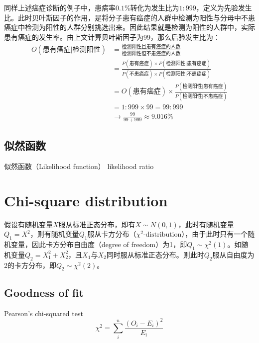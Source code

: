 \documentclass[11pt]{article}
\begin{document}
\begin{example}
    同样上述癌症诊断的例子中，患病率$0.1\%$转化为发生比为$1:999$，定义为先验发生比。此时贝叶斯因子的作用，是将分子患有癌症的人群中检测为阳性与分母中不患癌症中检测为阳性的人群分别挑选出来。因此结果就是检测为阳性的人群中，实际患有癌症的发生率。由上文计算贝叶斯因子为99，那么后验发生比为：
    \begin{align*}
        O(\text{患有癌症}|\text{检测阳性}) &= \frac{\text{检测阳性且患有癌症的人数}}{\text{检测阳性但不患癌症的人数}} \\
        &= \frac{P(\text{患有癌症}) \times P(\text{检测阳性}|\text{患有癌症})}{P(\text{不患癌症}) \times P(\text{检测阳性}|\text{不患癌症})} \\
        &= O(\text{患有癌症}) \times \frac{P(\text{检测阳性}|\text{患有癌症})}{P(\text{检测阳性}|\text{不患癌症})} \\
        &= 1:999 \times 99 = 99:999 \\
        &\rightarrow \frac{99}{99+999} \approx 9.016\%
    \end{align*}
\end{example}

\subsection{似然函数}

似然函数（Likelihood function）
likelihood ratio

\section{Chi-square distribution}

假设有随机变量$X$服从标准正态分布，即有$X \sim N(0,1)$，此时有随机变量$Q_1=X^2$，则有随机变量$Q_1$服从卡方分布（$\chi^2\text{-distribution}$），由于此时只有一个随机变量，因此卡方分布自由度（degree of freedom）为1，即$Q_1 \sim \chi^2(1)$。如随机变量$Q_2 = X_1^2 + X_2^2$，且$X_1$与$X_2$同时服从标准正态分布。则此时$Q_2$服从自由度为2的卡方分布，即$Q_2 \sim \chi^2(2)$。

\subsection*{Goodness of fit}

Pearson's chi-squared test
\begin{equation*}
    \chi^2 = \sum_i^n \frac{(O_i - E_i)^2}{E_i}
\end{equation*}
\end{document}
